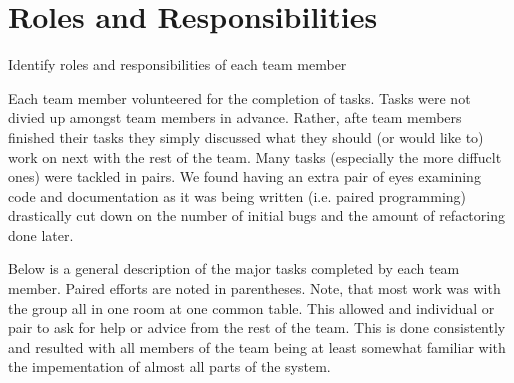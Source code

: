 \section{Roles and Responsibilities}
Identify roles and responsibilities of each team member

Each team member volunteered for the completion of tasks.  Tasks were not divied up amongst team members in advance.  Rather, afte team members finished their tasks they simply discussed what they should (or would like to) work on next with the rest of the team.  Many tasks (especially the more diffuclt ones) were tackled in pairs.  We found having an extra pair of eyes examining code and documentation as it was being written (i.e. paired programming) drastically cut down on the number of initial bugs and the amount of refactoring done later.

Below is a general description of the major tasks completed by each team member.  Paired efforts are noted in parentheses.  Note, that most work was with the group all in one room at one common table.  This allowed and individual or pair to ask for help or advice from the rest of the team.  This is done consistently and resulted with all members of the team being at least somewhat familiar with the impementation of almost all parts of the system.

